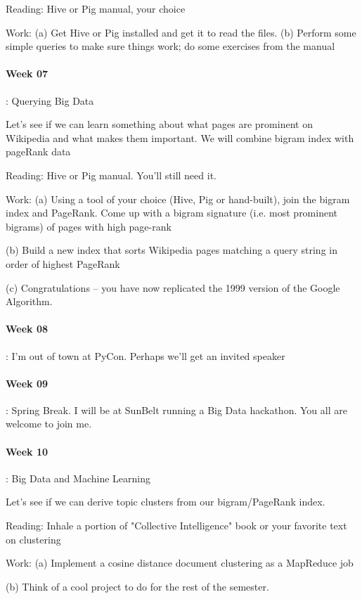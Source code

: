\documentclass[12pt]{article}
\begin{document}
Reading: 
Hive or Pig manual, your choice

Work: 
(a) Get Hive or Pig installed and get it to read the files. 
(b) Perform some simple queries to make sure things work; do some exercises from the manual

\paragraph{Week 07}: Querying Big Data

Let's see if we can learn something about what pages are prominent on Wikipedia and what makes them important. We will combine bigram index with pageRank data

Reading:
Hive or Pig manual. You'll still need it.

Work:
(a) Using a tool of your choice (Hive, Pig or hand-built), join the bigram index and PageRank. Come up with a bigram signature (i.e. most prominent bigrams) of pages with high page-rank

(b) Build a new index that sorts Wikipedia pages matching a query string in order of highest PageRank

(c) Congratulations -- you have now replicated the 1999 version of the Google Algorithm. 

\paragraph{Week 08}: I'm out of town at PyCon. Perhaps we'll get an invited speaker

\paragraph{Week 09}: Spring Break. I will be at SunBelt running a Big Data hackathon. You all are welcome to join me. 

\paragraph{Week 10}: Big Data and Machine Learning

Let's see if we can derive topic clusters from our bigram/PageRank index. 

Reading: 
Inhale a portion of "Collective Intelligence" book or your favorite text on clustering

Work:
(a) Implement a cosine distance document clustering as a MapReduce job

(b) Think of a cool project to do for the rest of the semester.
\end{document}
